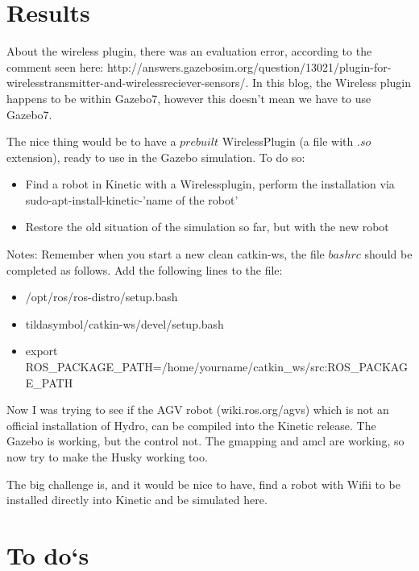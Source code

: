 \documentclass[11pt,a4paper]{article}
\begin{document}

%
%



\section{Results}

About the wireless plugin, there was an evaluation error, according to the comment seen here: http://answers.gazebosim.org/question/13021/plugin-for-wirelesstransmitter-and-wirelessreciever-sensors/. In this blog, the Wireless plugin happens to be within Gazebo7, however this doesn't mean we have to use Gazebo7. 

The nice thing would be to have a $prebuilt$ WirelessPlugin (a file with $.so$ extension), ready to use in the Gazebo simulation. To do so:
\begin{itemize}
\item Find a robot in Kinetic with a Wirelessplugin, perform the installation via sudo-apt-install-kinetic-'name of the robot'
\item Restore the old situation of the simulation so far, but with the new robot
\end{itemize}

Notes: Remember when you start a new clean catkin-ws, the file $bashrc$ should be completed as follows. Add the following lines to the file:
\begin{itemize}
\item /opt/ros/ros-distro/setup.bash
\item tildasymbol/catkin-ws/devel/setup.bash
\item export ROS{\_}PACKAGE{\_}PATH=/home/yourname/catkin{\_}ws/src:ROS{\_}PACKAGE{\_}PATH
\end{itemize}

Now I was trying to see if the AGV robot (wiki.ros.org/agvs) which is not an official installation of Hydro, can be compiled into the Kinetic release. The Gazebo is working, but the control not. The gmapping and amcl are working, so now try to make the Husky working too.

The big challenge is, and it would be nice to have, find a robot with Wifii to be installed directly into Kinetic and be simulated here.


\section{To do`s} \label{sec:todos}
\end{document}
